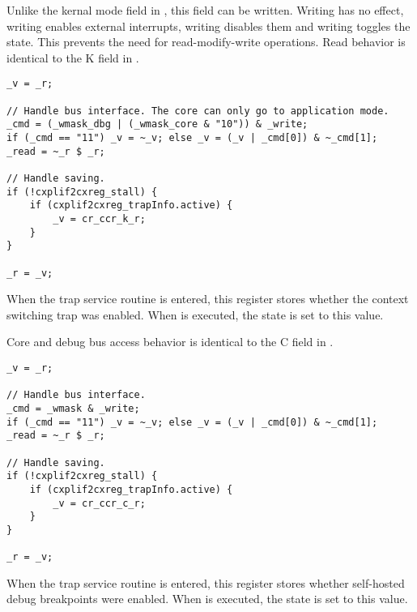 Unlike the kernal mode field in , this field can be written. Writing 
 has no effect, writing  enables external interrupts, writing 
 disables them and writing  toggles the state. This prevents 
the need for read-modify-write operations. Read behavior is identical to the
K field in .

\declaration{}
\implementation{}
\begin{lstlisting}
_v = _r;

// Handle bus interface. The core can only go to application mode.
_cmd = (_wmask_dbg | (_wmask_core & "10")) & _write;
if (_cmd == "11") _v = ~_v; else _v = (_v | _cmd[0]) & ~_cmd[1];
_read = ~_r $ _r;

// Handle saving.
if (!cxplif2cxreg_stall) {
    if (cxplif2cxreg_trapInfo.active) {
        _v = cr_ccr_k_r;
    }
}

_r = _v;
\end{lstlisting}

When the trap service routine is entered, this register stores whether the 
context switching trap was enabled. When  is executed, the state is 
set to this value.

Core and debug bus access behavior is identical to the C field in .

\declaration{}
\implementation{}
\begin{lstlisting}
_v = _r;

// Handle bus interface.
_cmd = _wmask & _write;
if (_cmd == "11") _v = ~_v; else _v = (_v | _cmd[0]) & ~_cmd[1];
_read = ~_r $ _r;

// Handle saving.
if (!cxplif2cxreg_stall) {
    if (cxplif2cxreg_trapInfo.active) {
        _v = cr_ccr_c_r;
    }
}

_r = _v;
\end{lstlisting}

When the trap service routine is entered, this register stores whether 
self-hosted debug breakpoints were enabled. When  is executed, the 
state is set to this value.

